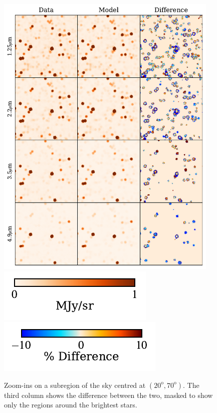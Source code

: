 \documentclass{aa}
\begin{document}
\begin{figure}
  \includegraphics[width=0.95\textwidth]{figs/zoom/combined_zoom.pdf}\\
  \vspace{-8pt}
  \hspace{1.5in}
  \includegraphics[scale=1]{figs/zoom/cbar1.pdf}
  \hspace{1.1in}
  \includegraphics[scale=1]{figs/zoom/cbar3.pdf}
  \caption{Zoom-ins on a subregion of the sky centred at $(20^\mathrm{o},70^\mathrm{o})$. The third column shows the difference between the two, masked to show only the regions around the brightest stars.}
  \label{fig:zooms}
\end{figure}
\end{document}
